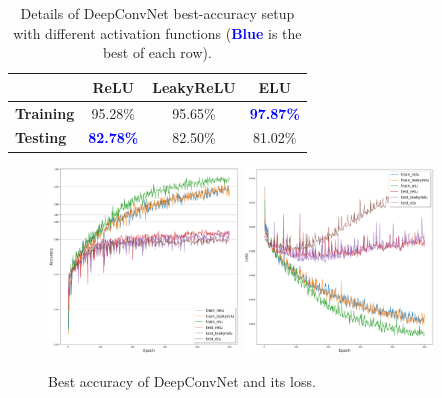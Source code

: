 	\begin{table}[htbp]
		\centering
		\begin{tabular}{l|ccc}
			\hline
			\diagbox{Accurcy}{Activation} & ReLU & LeakyReLU & ELU \\ 
			\hline
			\textbf{Training} & 95.28\% & 95.65\% & \textcolor{blue}{\textbf{97.87\%}} \\ 
			\textbf{Testing} & \textcolor{blue}{\textbf{82.78\%}} & 82.50\% & 81.02\% \\ 
			\hline
		\end{tabular}
		\caption{Details of DeepConvNet best-accuracy setup \\ with different activation functions (\textcolor{blue}{\textbf{Blue}} is the best of each row).}
		\label{deepconvnet-best-acc-table}
	\end{table}

	\begin{figure}[H]
		\centering
		\includegraphics[width=0.45\textwidth]{img/deepconvnet_adam_64_0.0005_0.5_acc.png}
		\includegraphics[width=0.45\textwidth]{img/deepconvnet_adam_64_0.0005_0.5_loss.png}
		\caption{Best accuracy of DeepConvNet and its loss.}
		\label{deepconvnet-best-acc}
	\end{figure}


